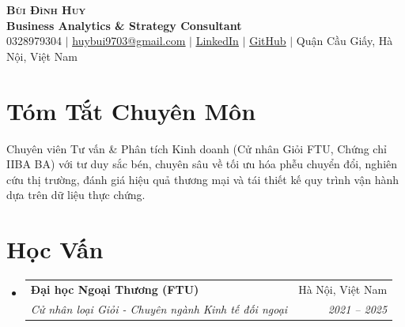 \documentclass[letterpaper,11pt]{article}
\makeatletter
\newcommand{\resumeSubheading}[4]{
  \vspace{2pt}\item
    \begin{tabular*}{\textwidth}[t]{l@{\extracolsep{\fill}}r}
      \textbf{#1} & #2 \\
      \textit{\small#3} & \textit{\small #4} \\
    \end{tabular*}\vspace{-2pt}
}
\newcommand{\resumeSubHeadingListStart}{\begin{itemize}[leftmargin=0.15in, label={}]}
\newcommand{\resumeSubHeadingListEnd}{\end{itemize}}
\makeatother
\begin{document}
\begin{center}
    \textbf{\Huge \scshape Bùi Đình Huy} \\ \vspace{3pt}
    \small \textbf{\color{NavyBlue} Business Analytics \& Strategy Consultant} \\ \vspace{4pt}
    \small 0328979304 $|$ \href{mailto:huybui9703@gmail.com}{\underline{huybui9703@gmail.com}} $|$ 
    \href{https://www.linkedin.com/in/dinh-huy-bui/}{\underline{LinkedIn}} $|$
    \href{https://github.com/dewey97}{\underline{GitHub}} $|$
    Quận Cầu Giấy, Hà Nội, Việt Nam
\end{center}

\vspace{2pt}

\section*{Tóm Tắt Chuyên Môn}
\small{Chuyên viên Tư vấn \& Phân tích Kinh doanh (Cử nhân Giỏi FTU, Chứng chỉ IIBA BA) với tư duy sắc bén, chuyên sâu về tối ưu hóa phễu chuyển đổi, nghiên cứu thị trường, đánh giá hiệu quả thương mại và tái thiết kế quy trình vận hành dựa trên dữ liệu thực chứng.}

\section*{Học Vấn}
  \resumeSubHeadingListStart
    \resumeSubheading
      {Đại học Ngoại Thương (FTU)}{Hà Nội, Việt Nam}
      {Cử nhân loại Giỏi - Chuyên ngành Kinh tế đối ngoại}{2021 -- 2025}
  \resumeSubHeadingListEnd

\end{document}
